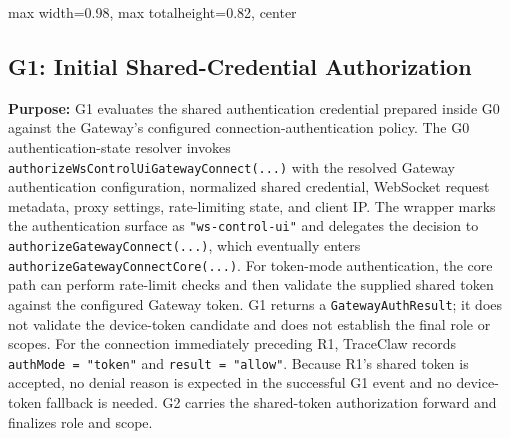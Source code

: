 \begin{center}
\begin{adjustbox}{
max width=0.98\textwidth,
max totalheight=0.82\textheight,
center
}

\end{adjustbox}

\end{center}


\subsection*{G1: Initial Shared-Credential Authorization}

\textbf{Purpose:}
G1 evaluates the shared authentication credential prepared inside G0
against the Gateway's configured connection-authentication policy.
The G0 authentication-state resolver invokes
\texttt{authorizeWsControlUiGatewayConnect(...)} with the resolved
Gateway authentication configuration, normalized shared credential,
WebSocket request metadata, proxy settings, rate-limiting state, and
client IP. The wrapper marks the authentication surface as
\texttt{"ws-control-ui"} and delegates the decision to
\texttt{authorizeGatewayConnect(...)}, which eventually enters
\texttt{authorizeGatewayConnectCore(...)}. For token-mode
authentication, the core path can perform rate-limit checks and then
validate the supplied shared token against the configured Gateway token.
G1 returns a \texttt{GatewayAuthResult}; it does not validate the
device-token candidate and does not establish the final role or scopes.
For the connection immediately preceding R1, TraceClaw records
\texttt{authMode = "token"} and \texttt{result = "allow"}.
Because R1's shared token is accepted, no denial reason is expected in
the successful G1 event and no device-token fallback is needed.
G2 carries the shared-token authorization forward and finalizes role and scope.

